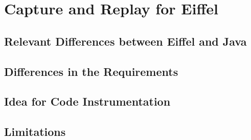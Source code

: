 \chapter{Capture and Replay for Eiffel}
\section{Relevant Differences between Eiffel and Java}
\section{Differences in the Requirements}
\section{Idea for Code Instrumentation}



\section {Limitations}
